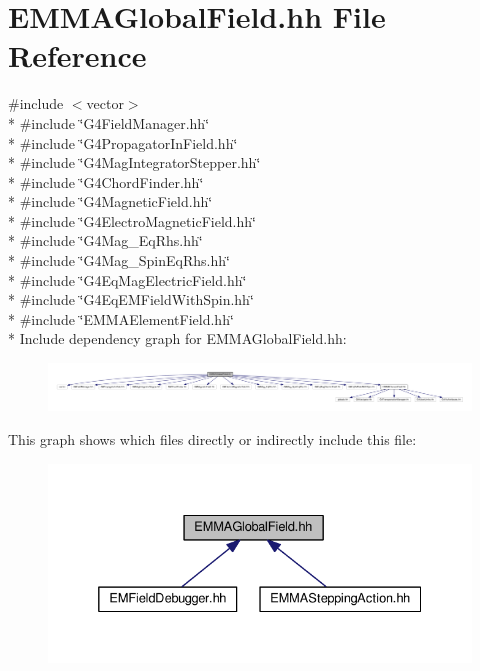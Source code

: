 \hypertarget{EMMAGlobalField_8hh}{}\section{E\+M\+M\+A\+Global\+Field.\+hh File Reference}
\label{EMMAGlobalField_8hh}
{\ttfamily \#include $<$vector$>$}\\*
{\ttfamily \#include \char`\"{}G4\+Field\+Manager.\+hh\char`\"{}}\\*
{\ttfamily \#include \char`\"{}G4\+Propagator\+In\+Field.\+hh\char`\"{}}\\*
{\ttfamily \#include \char`\"{}G4\+Mag\+Integrator\+Stepper.\+hh\char`\"{}}\\*
{\ttfamily \#include \char`\"{}G4\+Chord\+Finder.\+hh\char`\"{}}\\*
{\ttfamily \#include \char`\"{}G4\+Magnetic\+Field.\+hh\char`\"{}}\\*
{\ttfamily \#include \char`\"{}G4\+Electro\+Magnetic\+Field.\+hh\char`\"{}}\\*
{\ttfamily \#include \char`\"{}G4\+Mag\+\_\+\+Eq\+Rhs.\+hh\char`\"{}}\\*
{\ttfamily \#include \char`\"{}G4\+Mag\+\_\+\+Spin\+Eq\+Rhs.\+hh\char`\"{}}\\*
{\ttfamily \#include \char`\"{}G4\+Eq\+Mag\+Electric\+Field.\+hh\char`\"{}}\\*
{\ttfamily \#include \char`\"{}G4\+Eq\+E\+M\+Field\+With\+Spin.\+hh\char`\"{}}\\*
{\ttfamily \#include \char`\"{}E\+M\+M\+A\+Element\+Field.\+hh\char`\"{}}\\*
Include dependency graph for E\+M\+M\+A\+Global\+Field.\+hh\+:
\nopagebreak
\begin{figure}[H]
\begin{center}
\leavevmode
\includegraphics[width=350pt]{EMMAGlobalField_8hh__incl}
\end{center}
\end{figure}
This graph shows which files directly or indirectly include this file\+:
\nopagebreak
\begin{figure}[H]
\begin{center}
\leavevmode
\includegraphics[width=332pt]{EMMAGlobalField_8hh__dep__incl}
\end{center}
\end{figure}
